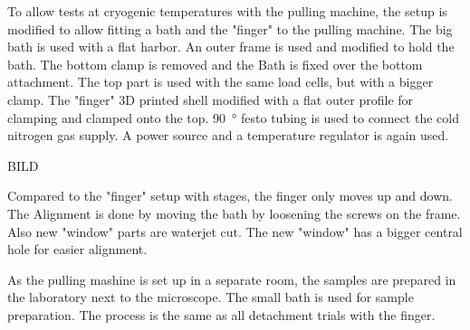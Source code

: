To allow tests at cryogenic temperatures with the pulling machine, the setup is modified to allow fitting a bath and the "finger" to the pulling machine. The big bath is used with a flat harbor. An outer frame is used and modified to hold the bath. The bottom clamp is removed and the Bath is fixed over the bottom attachment. The top part is used with the same load cells, but with a bigger clamp. The "finger" 3D printed shell modified with a flat outer profile for clamping and clamped onto the top. \SI{90}{\degree} festo tubing is used to connect the cold nitrogen gas supply. A power source and a temperature regulator is again used. 

BILD

Compared to the "finger" setup with stages, the finger only moves up and down. The Alignment is done by moving the bath by loosening the screws on the frame. Also new "window" parts are waterjet cut. The new "window" has a bigger central hole for easier alignment.

As the pulling mashine is set up in a separate room, the samples are prepared in the laboratory next to the microscope. The small bath is used for sample preparation. The process is the same as all detachment trials with the finger. 
